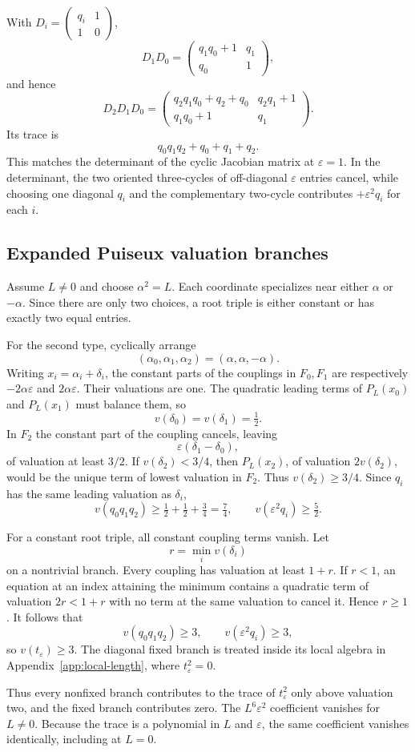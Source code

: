 \documentclass[11pt]{article}
\theoremstyle{definition}
\begin{document}
With $D_i=\left(\begin{smallmatrix}q_i&1\\1&0\end{smallmatrix}\right)$,
\[
D_1D_0
=
\begin{pmatrix}
q_1q_0+1&q_1\\
q_0&1
\end{pmatrix},
\]
and hence
\[
D_2D_1D_0
=
\begin{pmatrix}
q_2q_1q_0+q_2+q_0&q_2q_1+1\\
q_1q_0+1&q_1
\end{pmatrix}.
\]
Its trace is
\[
q_0q_1q_2+q_0+q_1+q_2.
\]
This matches the determinant of the cyclic Jacobian matrix at $\varepsilon=1$. In the determinant, the two oriented three-cycles of off-diagonal $\varepsilon$ entries cancel, while choosing one diagonal $q_i$ and the complementary two-cycle contributes $+\varepsilon^2q_i$ for each $i$.

\subsection{Expanded Puiseux valuation branches}

Assume $L\ne0$ and choose $\alpha^2=L$. Each coordinate specializes near either $\alpha$ or $-\alpha$. Since there are only two choices, a root triple is either constant or has exactly two equal entries.

For the second type, cyclically arrange
\[
(\alpha_0,\alpha_1,\alpha_2)=(\alpha,\alpha,-\alpha).
\]
Writing $x_i=\alpha_i+\delta_i$, the constant parts of the couplings in $F_0,F_1$ are respectively $-2\alpha\varepsilon$ and $2\alpha\varepsilon$. Their valuations are one. The quadratic leading terms of $P_L(x_0)$ and $P_L(x_1)$ must balance them, so
\[
v(\delta_0)=v(\delta_1)=\tfrac12.
\]
In $F_2$ the constant part of the coupling cancels, leaving
\[
\varepsilon(\delta_1-\delta_0),
\]
of valuation at least $3/2$. If $v(\delta_2)<3/4$, then $P_L(x_2)$, of valuation $2v(\delta_2)$, would be the unique term of lowest valuation in $F_2$. Thus $v(\delta_2)\ge3/4$. Since $q_i$ has the same leading valuation as $\delta_i$,
\[
v(q_0q_1q_2)\ge\tfrac12+\tfrac12+\tfrac34=\tfrac74,
\qquad
v(\varepsilon^2q_i)\ge\tfrac52.
\]

For a constant root triple, all constant coupling terms vanish. Let
\[
r=\min_i v(\delta_i)
\]
on a nontrivial branch. Every coupling has valuation at least $1+r$. If $r<1$, an equation at an index attaining the minimum contains a quadratic term of valuation $2r<1+r$ with no term at the same valuation to cancel it. Hence $r\ge1$. It follows that
\[
v(q_0q_1q_2)\ge3,
\qquad
v(\varepsilon^2q_i)\ge3,
\]
so $v(t_\varepsilon)\ge3$. The diagonal fixed branch is treated inside its local algebra in Appendix~\ref{app:local-length}, where $t_\varepsilon^2=0$.

Thus every nonfixed branch contributes to the trace of $t_\varepsilon^2$ only above valuation two, and the fixed branch contributes zero. The $L^6\varepsilon^2$ coefficient vanishes for $L\ne0$. Because the trace is a polynomial in $L$ and $\varepsilon$, the same coefficient vanishes identically, including at $L=0$.
\end{document}
